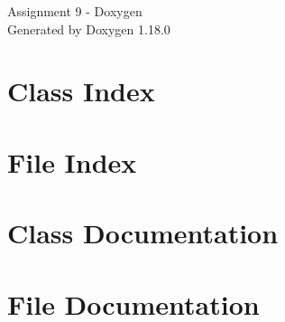 \documentclass[twoside]{book}
\newcommand{\+}{\discretionary{\mbox{\scriptsize$\hookleftarrow$}}{}{}}
\newcommand{\clearemptydoublepage}{%
    \newpage{\pagestyle{empty}\cleardoublepage}%
  }
\begin{document}
  \raggedbottom
    \hypersetup{pageanchor=false,
                bookmarksnumbered=true,
                pdfencoding=unicode
               }
  \begin{titlepage}
  \vspace*{7cm}
  \begin{center}%
  {\Large Assignment 9 -\/ Doxygen}\\
  \vspace*{1cm}
  {\large Generated by Doxygen 1.18.0}\\
  \end{center}
  \end{titlepage}
  \clearemptydoublepage
  \tableofcontents
  \clearemptydoublepage
  \hypersetup{pageanchor=true}


\chapter{Class Index}

\chapter{File Index}

\chapter{Class Documentation}


\chapter{File Documentation}





  \backmatter
  \newpage
  \clearemptydoublepage
  \printindex
\end{document}

